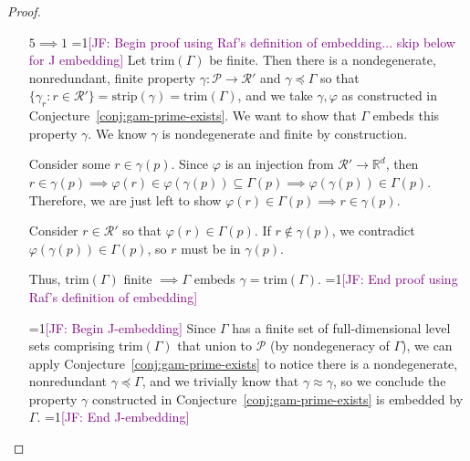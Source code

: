 \documentclass[12pt]{article}
\newcommand{\Comments}{1}
\newcommand{\mynote}[2]{\ifnum\Comments=1\textcolor{#1}{#2}\fi}
\newcommand{\jessie}[1]{\mynote{purple}{[JF: #1]}}
\newcommand{\reals}{\mathbb{R}}
\renewcommand{\P}{\mathcal{P}}
\newcommand{\R}{\mathcal{R}}
\newcommand{\trim}{\mathrm{trim}}
\newcommand{\strip}{\mathrm{strip}}
\newcommand{\card}{\textbf{card}}
\begin{document}
\begin{proof}
\begin{enumerate}
\item[$5 \implies 1$] 
\jessie{Begin proof using Raf's definition of embedding... skip below for J embedding}
Let $\trim(\Gamma)$ be finite.
Then there is a nondegenerate, nonredundant, finite property $\gamma: \P \to \R'$ and $\gamma \preceq \Gamma$ so that $\{ \gamma_r : r \in \R' \} = \strip(\gamma) = \trim(\Gamma)$, and we take $\gamma, \varphi$ as constructed in Conjecture~\ref{conj:gam-prime-exists}.
We want to show that $\Gamma$ embeds this property $\gamma$.
We know $\gamma$ is nondegenerate and finite by construction.


Consider some $r \in \gamma(p)$.
Since $\varphi$ is an injection from $\R' \to \reals^d$, then $r \in \gamma(p) \implies \varphi(r) \in \varphi(\gamma(p)) \subseteq \Gamma(p) \implies \varphi(\gamma(p)) \in \Gamma(p)$.
Therefore, we are just left to show $\varphi(r) \in \Gamma(p) \implies r \in \gamma(p)$.

Consider $r \in \R'$ so that $\varphi(r) \in \Gamma(p)$.
If $r \not \in \gamma(p)$, we contradict $\varphi(\gamma(p)) \in \Gamma(p)$, so $r$ must be in $\gamma(p)$.

Thus, $\trim(\Gamma)$ finite $\implies \Gamma$ embeds $\gamma = \trim(\Gamma)$.
\jessie{End proof using Raf's definition of embedding}

\jessie{Begin J-embedding}
Since $\Gamma$ has a finite set of full-dimensional level sets comprising $\trim(\Gamma)$ that union to $\P$ (by nondegeneracy of $\Gamma$), we can apply Conjecture~\ref{conj:gam-prime-exists} to notice there is a nondegenerate, nonredundant $\gamma \preceq \Gamma$, and we trivially know that $\gamma \approx \gamma$, so we conclude the property $\gamma$ constructed in Conjecture~\ref{conj:gam-prime-exists} is embedded by $\Gamma$.
\jessie{End J-embedding}



%



\end{enumerate}
\end{proof}
\end{document}
